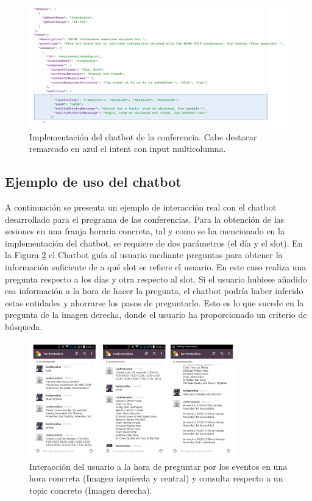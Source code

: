 \begin{figure}[htb]
	\centering
	\includegraphics[width=1\textwidth]{./figs/DSLConference.png}
	\caption{Implementación del chatbot de la conferencia. Cabe destacar remarcado en azul el intent con input multicolumna.}
	\label{fig:DSLConference}
\end{figure}

\subsection{Ejemplo de uso del chatbot}

A continuación se presenta un ejemplo de interacción real con el chatbot desarrollado para el programa de las conferencias. Para la obtención de las sesiones en una franja horaria concreta, tal y como se ha mencionado en la implementación del chatbot, se requiere de dos parámetros (el día y el slot). En la Figura \ref{fig:EjecucionConference} el Chatbot guía al usuario mediante preguntas para obtener la información suficiente de a qué slot se refiere el usuario. En este caso realiza una pregunta respecto a los días y otra respecto al slot. Si el usuario hubiese añadido esa información a la hora de hacer la pregunta, el chatbot podría haber inferido estas entidades y ahorrarse los pasos de preguntarlo. Esto es lo que sucede en la pregunta de la imagen derecha, donde el usuario ha proporcionado un criterio de búsqueda.

\begin{figure}[htb]
	\centering
	\includegraphics[width=0.8\textwidth]{./figs/EjecucionConferencia.png}
	\caption{Interacción del usuario a la hora de preguntar por los eventos en una hora concreta (Imagen izquierda y central) y consulta respecto a un topic concreto (Imagen derecha).}
	\label{fig:EjecucionConference}
\end{figure}


